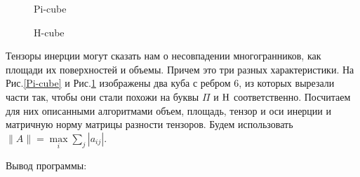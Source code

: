 \documentclass[a4paper,12pt, titlepage]{article}
\begin{document}
\begin{figure}[h]
\noindent
\begin{multicols}{2}
\noindent{}		
	\caption{Pi-cube}
	\label{Pi-cube}
\noindent{}		
	\caption{H-cube}
	\label{H-cube}
\end{multicols}
\end{figure}

Тензоры инерции могут сказать нам о несовпадении многогранников, как площади их поверхностей и объемы. Причем это три разных 
характеристики. На  Рис.\ref{Pi-cube} и Рис.\ref{H-cube} изображены два куба с  ребром 6, из которых вырезали части так,
чтобы они стали похожи на буквы $\Pi$ и $\rm H$ соответственно. Посчитаем для них описанными алгоритмами  объем, площадь,
тензор и оси инерции и матричную норму матрицы разности тензоров. Будем использовать $\|A\| = \max\limits_i \sum\limits_j |a_{ij}|$. 
 
 

Вывод программы:
\end{document}

